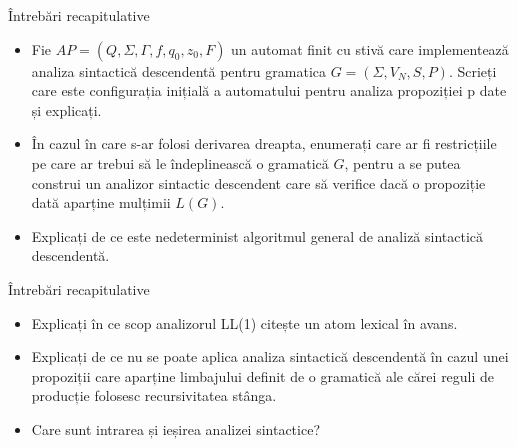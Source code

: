 \documentclass[pdf]{beamer}
\begin{document}
\begin{frame}{Întrebări recapitulative}
\begin{itemize}
\item
Fie $AP=(Q, \Sigma, \Gamma, f, q_0, z_0, F)$ un automat finit cu stivă care implementează analiza sintactică descendentă pentru gramatica $G=(\Sigma, V_N, S, P)$. Scrieți care este configurația inițială a automatului pentru analiza propoziției p date și explicați.
\newline

\item
În cazul în care s-ar folosi derivarea dreapta, enumerați care ar fi restricțiile pe care ar trebui să le îndeplinească o gramatică $G$, pentru a se putea construi un analizor sintactic descendent care să verifice dacă o propoziție dată aparține mulțimii $L(G)$.
\newline

\item
Explicați de ce este nedeterminist algoritmul general de analiză sintactică descendentă.
\newline

\end{itemize}
\end{frame}



\begin{frame}{Întrebări recapitulative}
\begin{itemize}
\item
Explicați în ce scop analizorul LL(1) citește un atom lexical în avans.
\newline

\item
Explicați de ce nu se poate aplica analiza sintactică descendentă în cazul unei propoziții care aparține limbajului definit de o gramatică ale cărei reguli de producție folosesc recursivitatea stânga.
\newline

\item
Care sunt intrarea și ieșirea analizei sintactice?

\end{itemize}
\end{frame}
\end{document}
